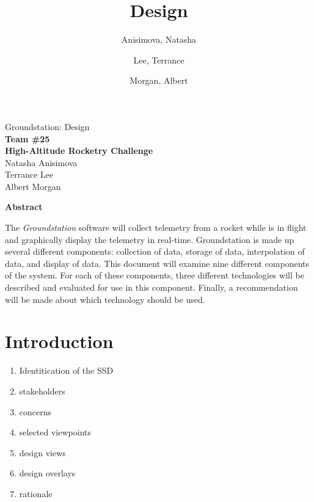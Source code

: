 \documentclass[10pt,draftclsnofoot,onecolumn]{IEEEtran}
\begin{document}
	\singlespace
	
	\title{\vspace{2in}Design}
	
	\author {
		Anisimova, Natasha
		\and
		Lee, Terrance
		\and
		Morgan, Albert
	}
	
	
	\pagestyle{empty}
	\vspace*{2in}
	\begin{center}
		\huge
		Groundstation: Design\\
		\normalsize
		\vspace{5mm}
		\textbf{
			Team \#25\\
			High-Altitude Rocketry Challenge\\
		}
		\vspace{1mm}
		Natasha Anisimova\\
		Terrance Lee\\
		Albert Morgan
	\end{center}
	
	\vspace{5mm}
	
	\begin{center}
		\textbf{Abstract}
	\end{center}
	
	
	The \textit{Groundstation} software will collect telemetry from a rocket while is in flight and graphically display the telemetry in real-time. Groundstation is made up several different components: collection of data, storage of data, interpolation of data, and 
	display of data.	
	This document will examine nine different components of the system.
	For each of these components, three different technologies will be described and evaluated for use in this component.
	Finally, a recommendation will be made about which technology should be used.	
	
	\newpage


	\section{Introduction}

	\begin{enumerate}
	\item Identitication of the SSD
	\item stakeholders
	\item concerns
	\item selected viewpoints
	\item design views
	\item design overlays
	\item rationale
	\end{enumerate}
\end{document}
